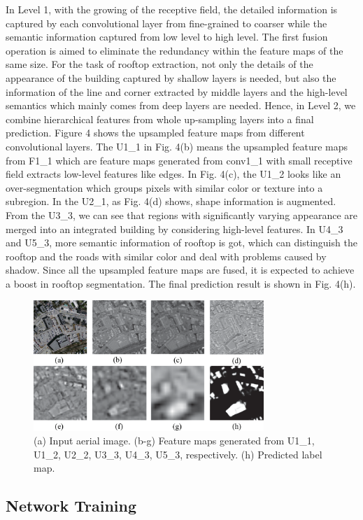 In Level 1, with the growing of the receptive field, the detailed information is captured by each convolutional layer from fine-grained to coarser while the semantic information captured from low level to high level. The first fusion operation is aimed to eliminate the redundancy within the feature maps of the same size. For the task of rooftop extraction, not only the details of the appearance of the building captured by shallow layers is needed, but also the information of the line and corner extracted by middle layers and the high-level semantics which mainly comes from deep layers are needed. 
Hence, in Level 2, we combine hierarchical features from whole up-sampling layers into a final prediction. Figure 4 shows the upsampled feature maps from different convolutional layers. 
The U1\_1 in Fig. 4(b) means the upsampled feature maps from F1\_1 which are feature maps generated from conv1\_1 with small receptive field extracts low-level features like edges. In Fig. 4(c), the U1\_2 looks like an over-segmentation which groups pixels with similar color or texture into a subregion. In the U2\_1, as Fig. 4(d) shows, shape information is augmented. 
From the U3\_3, we can see that regions with significantly varying appearance are merged into an integrated building by considering high-level features. In U4\_3 and U5\_3, more semantic information of rooftop is got, which can distinguish the rooftop and the roads with similar color and deal with problems caused by shadow. Since all the upsampled feature maps are fused, it is expected to achieve a boost in rooftop segmentation. The final prediction result is shown in Fig. 4(h).
\begin{figure}
\centering
\includegraphics[width=8.7cm]{Figures/feature_maps.eps}
\caption{(a) Input aerial image. (b-g) Feature maps generated from U1\_1, U1\_2, U2\_2, U3\_3, U4\_3, U5\_3, respectively. (h) Predicted label map.}
\label{4}
\end{figure}


\subsection{Network Training}

